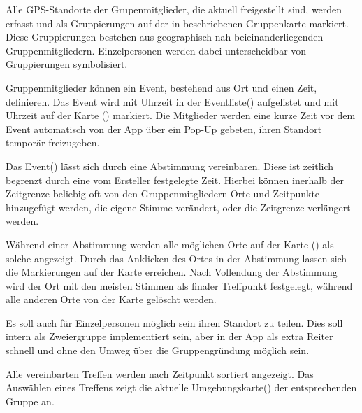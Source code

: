 \documentclass[parskip=full,11pt]{scrartcl}
\begin{document}
Alle GPS-Standorte der Grupenmitglieder, die aktuell freigestellt sind, werden erfasst und als Gruppierungen auf der in  beschriebenen Gruppenkarte markiert.
Diese Gruppierungen bestehen aus geographisch nah beieinanderliegenden Gruppenmitgliedern.
Einzelpersonen werden dabei unterscheidbar von Gruppierungen symbolisiert.

Gruppenmitglieder können ein Event, bestehend aus Ort und einen Zeit, definieren.
Das Event wird mit Uhrzeit in der Eventliste() aufgelistet und mit Uhrzeit auf der Karte () markiert.
Die Mitglieder werden eine kurze Zeit vor dem Event automatisch von der App über ein Pop-Up gebeten, ihren Standort temporär freizugeben.

Das Event() lässt sich durch eine Abstimmung vereinbaren.
Diese ist zeitlich begrenzt durch eine vom Ersteller festgelegte Zeit.
Hierbei können inerhalb der Zeitgrenze beliebig oft von den Gruppenmitgliedern Orte und Zeitpunkte hinzugefügt werden, die eigene Stimme verändert, oder die Zeitgrenze verlängert werden.

Während einer Abstimmung werden alle möglichen Orte auf der Karte () als solche angezeigt.
Durch das Anklicken des Ortes in der Abstimmung lassen sich die Markierungen auf der Karte erreichen.
Nach Vollendung der Abstimmung wird der Ort mit den meisten Stimmen als finaler Treffpunkt festgelegt, während alle anderen Orte von der Karte gelöscht werden.

Es soll auch für Einzelpersonen möglich sein ihren Standort zu teilen.
Dies soll intern als Zweiergruppe implementiert sein, aber in der App als extra Reiter schnell und ohne den Umweg über die Gruppengründung möglich sein.

Alle vereinbarten Treffen werden nach Zeitpunkt sortiert angezeigt.
Das Auswählen eines Treffens zeigt die aktuelle Umgebungskarte() der entsprechenden Gruppe an.

\end{document}

